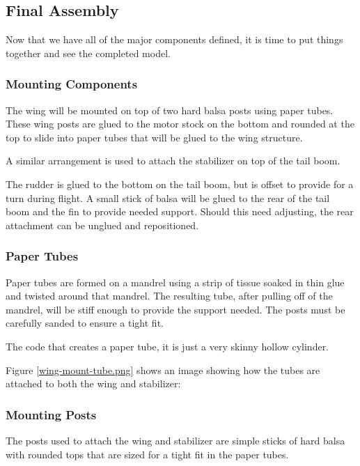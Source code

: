 \subsection{Final Assembly}

Now that we have all of the major components defined, it is time to put things
together and see the completed model.

\subsubsection{Mounting Components}

The wing will be mounted on top of two hard balsa posts using paper tubes.
These wing posts are glued to the motor stock on the bottom and rounded at the
top to slide into paper tubes that will be glued to the wing structure.

A similar arrangement is used to attach the stabilizer on top of the tail boom.

The rudder is glued to the bottom on the tail boom, but is offset to provide for
a turn during flight. A small stick of balsa will be glued to the rear of the
tail boom and the fin to provide needed support. Should this need adjusting,
the rear attachment can be unglued and repositioned.

\subsubsection{Paper Tubes}

Paper tubes are formed on a mandrel using a strip of tissue soaked in thin
glue and twisted around that mandrel. The resulting tube, after pulling off of
the mandrel, will be stiff enough to provide the support needed. The posts must
be carefully sanded to ensure a tight fit.

The code that creates a paper tube, it is just a very skinny hollow cylinder.

Figure \ref{wing-mount-tube.png} shows an image showing how the tubes are attached
to both the wing and stabilizer:


\subsubsection{Mounting Posts}

The posts used to attach the wing and stabilizer are simple sticks of hard balsa with
rounded tops that are sized for a tight fit in the paper tubes.

